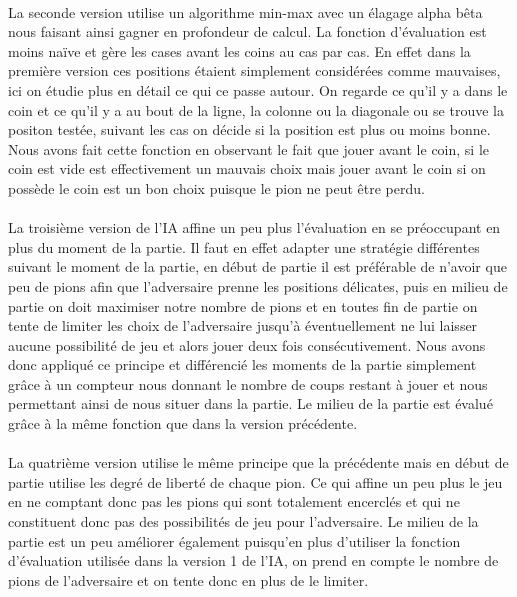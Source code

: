 \documentclass[a4paper,10pt]{article}
\begin{document}
\paragraph{}La seconde version utilise un algorithme min-max avec un élagage alpha b\^eta  nous faisant ainsi gagner en profondeur de calcul. La fonction d'évaluation est moins naïve et gère les cases avant les coins au cas par cas. En effet dans la première version ces positions étaient simplement considérées comme mauvaises, ici on étudie plus en détail ce qui ce passe autour. On regarde ce qu'il y a dans le coin et ce qu'il y a au bout de la ligne, la colonne ou la diagonale ou se trouve la positon testée, suivant les cas on décide si la position est plus ou moins bonne.
Nous avons fait cette fonction en observant le fait que jouer avant le coin, si le coin est vide est effectivement un mauvais choix mais jouer avant le coin si on possède le coin est un bon choix puisque le pion ne peut \^etre perdu.

\paragraph{} La troisième version de l'IA affine un peu plus l'évaluation en se préoccupant en plus du moment de la partie. Il faut en effet adapter une stratégie différentes suivant le moment de la partie, en début de partie il est préférable de n'avoir que peu de pions afin que l'adversaire prenne les positions délicates, puis en milieu de partie on doit maximiser notre nombre de pions et en toutes fin de partie on tente de limiter les choix de l'adversaire jusqu'à éventuellement ne lui laisser aucune possibilité de jeu et alors jouer deux fois consécutivement.
Nous avons donc appliqué ce principe et différencié les moments de la partie simplement grâce à un compteur nous donnant le nombre de coups restant à jouer et nous permettant ainsi de nous situer dans la partie.
Le milieu de la partie est évalué grâce à la même fonction que dans la version précédente.

\paragraph{} La quatrième version utilise le même principe que la précédente mais en début de partie utilise les degré de liberté de chaque pion. Ce qui affine un peu plus le jeu en ne comptant donc pas les pions qui sont totalement encerclés et qui ne constituent donc pas des possibilités de jeu pour l'adversaire.
Le milieu de la partie est un peu améliorer également puisqu'en plus d'utiliser la fonction d'évaluation utilisée dans la version 1 de l'IA, on prend en compte le nombre de pions de l'adversaire et on tente donc en plus de le limiter.
\end{document}
